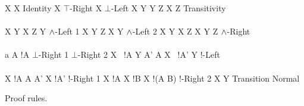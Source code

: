 \begin{FIGURE}
\begin{RULES}

  \ZEROPREMISERULENAMEDRIGHT
  {
    X \judge X
  }{Identity}
    \quad
  \ZEROPREMISERULENAMEDRIGHT
  {
    X \judge \top
  }{$\top$-Right}
    \quad
  \ZEROPREMISERULENAMEDRIGHT
  {
    \bot \judge X
  }{$\bot$-Left}
    \quad
  \TWOPREMISERULENAMEDRIGHT
  {
    X \judge Y
  }
  {
    Y \judge Z
  }
  {
    X \judge Z
  }{Transitivity}
    \\\\
  \ONEPREMISERULENAMEDRIGHT
  {
    X \judge Y
  }
  {
    X \AND Z \judge Y
  }{$\land$-Left 1}
     \quad
  \ONEPREMISERULENAMEDRIGHT
  {
    X \judge Y
  }
  {
    Z \AND X  \judge Y
  }{$\land$-Left 2}
     \quad
  \TWOPREMISERULENAMEDRIGHT
  {
    X \judge Y
  }
  {
    X \judge Z
  }
  {
    X \judge Y \AND Z
  }{$\land$-Right}
     \\\\
     \ONEPREMISERULENAMEDRIGHT
     {
       a \notin A
     }
     {
       !A \AND {} \judge \bot
     }{$\bot$-Right 1}
        \quad
     \ZEROPREMISERULENAMEDRIGHT
     {
        \judge \bot
     }{$\bot$-Right 2}
        \quad
     \TWOPREMISERULENAMEDRIGHT
     {
       X \AND \, !A \judge Y
     }
     {
       A' \subseteq A
     }
     {
       X \AND\, !A' \judge Y
     }{!-Left}
     \\\\
     \TWOPREMISERULENAMEDRIGHT
     {
       X \judge !A
     }
     {
       A \subseteq A'
     }
     {
       X \judge!A'
     }{!-Right 1}
     \quad
     \TWOPREMISERULENAMEDRIGHT
     {
       X \judge !A
     }
     {
       X \judge !B
     }
     {
       X \judge !(A \cap B)
     }{!-Right 2}
     \quad
     \ONEPREMISERULENAMEDRIGHT
     {
       X \judge Y
     }
     {
        \judge {}
     }{Transition Normal}
\end{RULES}
\caption{Proof rules.}\label{figure:elAndBangRules}
\end{FIGURE}
